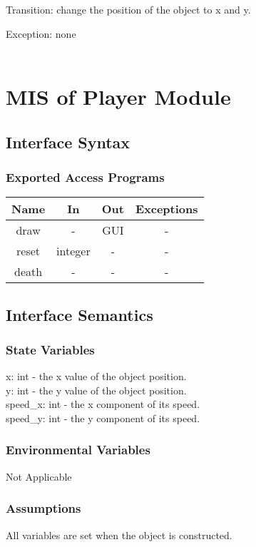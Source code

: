 \documentclass[12,english]{article}
\begin{document}
		Transition: change the position of the object to x and y.
		
		Exception: none\\ 
		\\


\section{MIS of Player Module}
	\subsection{Interface Syntax}
		\subsubsection{Exported Access Programs}
		
	\begin{tabular}[pos]{|c|c|c|c|}
	\hline
	\textbf{Name}& \textbf{In} & \textbf{Out} & \textbf{Exceptions} \\ 
	\hline
	draw & - & GUI & -\\ 
	\hline
	reset & integer & - & -\\
	\hline
	death & - & - & -\\
	\hline
					
	\end{tabular}		
		
	\subsection{Interface Semantics}
		\subsubsection{State Variables}
		x: int - the x value of the object position.\\
		y: int - the y value of the object position.\\
		speed\_x: int - the x component of its speed.\\
		speed\_y: int - the y component of its speed.\\
		\subsubsection{Environmental Variables}
		Not Applicable
		\subsubsection{Assumptions}
All variables are set when the object is constructed.
\end{document}
